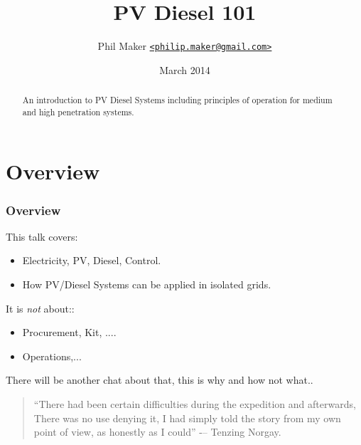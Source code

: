 \documentclass{beamer}
\title{PV Diesel 101}
\author{Phil Maker
  \href{mailto:philip.maker@gmail.com}{\texttt{<philip.maker@gmail.com>}}
}
\institute{Powerwater Remote Operations/ACEP}
\date{March 2014}
\begin{document}
\begin{frame}
  \maketitle
  \vspace{-1.2cm}
  \begin{abstract}
    \small An introduction to PV Diesel Systems including principles
    of operation for medium and high penetration systems.
  \end{abstract}
\end{frame}

\section{Overview}
\begin{frame}\frametitle{Overview}
  This talk covers:
  \begin{itemize}
  \item Electricity, PV, Diesel, Control.
  \item How PV/Diesel Systems can be applied in isolated grids.
  \end{itemize}
  \pause
  It is \emph{not} about::

  \begin{itemize}
  \item Procurement, Kit, ....
  \item Operations,...
  \end{itemize}

  \pause
  There will be another chat about that, this is why and how not what..
  \vfill
  \begin{quote}
    ``There had been certain difficulties during
    the expedition and afterwards, There was
    no use denying it, I had simply told the
    story from my own point of view, as
    honestly as I could'' -– Tenzing Norgay.     
  \end{quote}
\end{frame}
\end{document}
